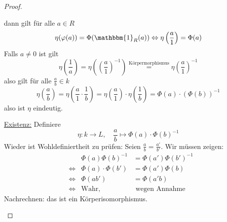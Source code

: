 \documentclass[12pt,parskip=full]{scrartcl}
\newcommand{\heading}{\underline}
\theoremstyle{definition}
\theoremstyle{remark}
\begin{document}
\begin{proof}
\begin{enumerate}
\begin{center}
			\end{center}
			dann gilt für alle $a \in R$
			\begin{equation*}
				\eta(\varphi(a)) = \Phi(\mathbbm{1}_R(a)) \Leftrightarrow \eta\left(\frac{a}{1}\right) = \Phi(a)
			\end{equation*}
			Falls $a \neq 0$ ist gilt
			\begin{equation*}
				\eta\left( \frac{1}{a} \right) = \eta\left( \left( \frac{a}{1} \right)^{-1} \right) \overset{\text{Körpermorphismus}}{=} \eta \left( \frac{a}{1} \right)^{-1}
			\end{equation*}
			also gilt für alle $\frac{a}{b} \in k$
			\begin{equation*}
				\eta \left( \frac{a}{b} \right) = \eta \left( \frac{a}{1} \cdot \frac{1}{b} \right) = \eta\left( \frac{a}{1} \right) \cdot \eta \left(
				\frac{1}{b}\right) = \Phi(a) \cdot \left( \Phi(b) \right)^{-1}
			\end{equation*}
			also ist $\eta$ eindeutig.
			
			\heading{Existenz:} Definiere
			\begin{equation*}
				\eta: k \to L, \quad \frac{a}{b} \mapsto \Phi(a) \cdot \Phi(b)^{-1}
			\end{equation*}
			Wieder ist Wohldefiniertheit zu prüfen: Seien $\frac{a}{b} = \frac{a'}{b'}$. Wir müssen zeigen:
			\begin{align*}
				&& \Phi(a) \Phi(b)^{-1} &= \Phi(a') \Phi(b')^{-1} \\
				&\Leftrightarrow& \Phi(a) \cdot \Phi(b') &= \Phi(a') \Phi(b) \\
				&\Leftrightarrow& \Phi(ab') &= \Phi(a'b) \\
				&\Leftrightarrow& \text{Wahr,}& \text{ wegen Annahme}
			\end{align*}
			Nachrechnen: das ist ein Körperisomorphismus.
		\end{enumerate}
	\end{proof}
\end{document}
